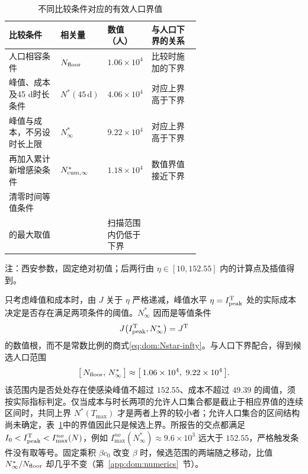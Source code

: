 \begin{table}[htbp]
\centering\small
\setlength{\tabcolsep}{3.5pt}
\renewcommand{\arraystretch}{1.25}
\begin{threeparttable}
\caption{不同比较条件对应的有效人口界值}
\label{tab:dom:thresholds}
\begin{tabularx}{\linewidth}{@{}>{\raggedright\arraybackslash}p{0.27\linewidth}>{\centering\arraybackslash}p{0.21\linewidth}>{\centering\arraybackslash}p{0.16\linewidth}>{\raggedright\arraybackslash}X@{}}
\toprule
比较条件 & 相关量 & 数值（人） & 与人口下界的关系\\
\midrule
人口相容条件 & $N_{\rm floor}$ & $1.06\times10^4$ & 比较时施加的下界\\
峰值、成本及45 d时长条件 & $N^*(45\,\mathrm d)$ & $4.06\times10^4$ & 对应上界高于下界\\
峰值与成本，不另设时长上限 & $N^*_{\infty}$ & $9.22\times10^4$ & 对应上界高于下界\\
再加入累计新增感染条件 & $N^*_{\rm cum,\infty}$ & $1.18\times10^4$ & 数值界值接近下界\\
清零时间等值条件 & \makecell{$N_{\rm clr}(\eta)$\\的最大取值} & 5184 & 扫描范围内仍低于下界\\
\bottomrule
\end{tabularx}
\begin{tablenotes}[flushleft]\footnotesize
\item 注：西安参数，固定绝对初值；后两行由 $\eta\in[10,152.55]$ 内的计算点及插值得到。
\end{tablenotes}
\end{threeparttable}
\end{table}

只考虑峰值和成本时，由 $J$ 关于 $\eta$ 严格递减，峰值水平 $\eta=I_{\rm peak}^{\rm T}$ 处的实际成本决定是否存在满足两项条件的阈值。$N^\ast_\infty$ 因而是等值条件
\[
J\bigl(I_{\rm peak}^{\rm T},N^\ast_\infty\bigr)=J^{\rm T}
\]
的数值根，而不是常数比例的商式\eqref{eq:dom:Nstar-infty}。与人口下界配合，得到候选人口范围
\begin{equation}
  \bigl[\,N_{\rm floor},\,N^\ast_\infty\,\bigr]
  \approx\bigl[\,1.06\times10^{4},\ 9.22\times10^{4}\,\bigr].
  \label{eq:dom:main-interval}
\end{equation}
该范围内是否处处存在使感染峰值不超过 $152.55$、成本不超过 $49.39$ 的阈值，须按实际指标判定。仅当成本与时长两项的允许人口集合都是截止于相应界值的连续区间时，共同上界 $N^\ast(T_{\max})$ 才是两者上界的较小者；允许人口集合的区间结构尚未确定，表~\ref{tab:dom:thresholds}中的界值因此只是候选上界。所报告的交点都满足 $I_0<I_{\rm peak}^{\rm T}<I_{\max}^{no}(N)$，例如 $I_{\max}^{no}(N^\ast_\infty)\approx9.6\times10^{3}$ 远大于 $152.55$，严格触发条件没有取等号。固定乘积 $\beta c_0$ 改变 $\beta$ 时，候选范围的两端随之移动，比值 $N^\ast_\infty/N_{\rm floor}$ 却几乎不变（第~\ref{app:dom:numerics}~节）。


